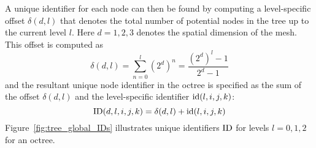 

A unique identifier for each node can then be found by computing a
level-specific offset $\delta(d,l)$ that denotes the total number of potential
nodes in the tree up to the current level $l$. Here $d=1,2,3$ denotes the
spatial dimension of the mesh. This offset is computed as
%
\begin{equation}
\delta(d,l) = \sum_{n=0}^l (2^d)^n = \frac{(2^d)^l - 1}{2^d - 1}
\end{equation}
%
and the resultant unique node identifier in the octree is specified as the
sum of the offset $\delta(d,l)$ and the level-specific identifier
$\text{id}(l,i,j,k)$:
%
\begin{equation}
\text{ID}(d,l,i,j,k) = \delta(d,l) + \text{id}(l,i,j,k)
\end{equation}
%
Figure~\ref{fig:tree_global_IDs} illustrates unique identifiers $\text{ID}$ for
levels $l=0,1,2$ for an octree.
